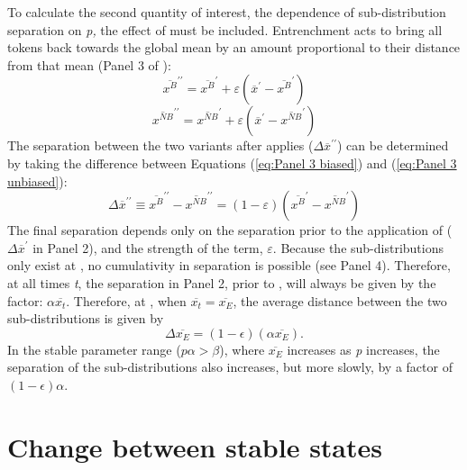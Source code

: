 To calculate the second quantity of interest, the dependence of sub-distribution
separation on \emph{p,} the effect of  must be included.
Entrenchment acts to bring all tokens back towards the global mean
by an amount proportional to their distance from that mean (Panel
3 of ): 
\begin{equation}
\overline{x^{B}}^{\prime\prime}=\overline{x^{B}}^{\prime}+\varepsilon\left(\overline{x}^{\prime}-\overline{x^{B}}^{\prime}\right)\label{eq:Panel 3 biased}
\end{equation}
\begin{equation}
\overline{x^{NB}}^{\prime\prime}=\overline{x^{NB}}^{\prime}+\varepsilon\left(\overline{x}^{\prime}-\overline{x^{NB}}^{\prime}\right)\label{eq:Panel 3 unbiased}
\end{equation}
The separation between the two  variants after 
applies ($\Delta\overline{x}^{\prime\prime}$) can be determined
by taking the difference between Equations (\ref{eq:Panel 3 biased})
and (\ref{eq:Panel 3 unbiased}): 
\begin{equation}
\Delta\overline{x}^{\prime\prime}\equiv\overline{x^{B}}^{\prime\prime}-\overline{x^{NB}}^{\prime\prime}=\left(1-\varepsilon\right)\left(\overline{x^{B}}^{\prime}-\overline{x^{NB}}^{\prime}\right)
\end{equation}
The final separation depends only on the separation prior to the application
of  ($\Delta\overline{x}^{\prime}$ in Panel 2), and
the strength of the  term, $\varepsilon$. Because the
sub-distributions only exist at , no cumulativity in separation
is possible (see Panel 4). Therefore, at all times \emph{t}, the separation
in Panel 2, prior to , will always be given by the 
factor: $\alpha\overline{x_{t}}$. Therefore, at , when
$\overline{x_{t}}=\overline{x_{E}}$, the average distance between
the two  sub-distributions is given by
\begin{equation}
\Delta\overline{x_{E}}=(1-\epsilon)(\alpha\overline{x_{E}}).\label{eq:Cat Sep}
\end{equation}
In the stable parameter range ($p\alpha>\beta$), where $\overline{x_{E}}$
increases as \emph{p} increases, the separation of the sub-distributions
also increases, but more slowly, by a factor of $(1-\epsilon)\alpha$.

\section{\label{sec:Actuation}Change between stable states}


